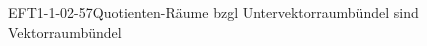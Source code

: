 
\begin{REM}{EFT1-1-02-57}{Quotienten-Räume bzgl Untervektorraumbündel sind Vektorraumbündel}
\end{REM}
